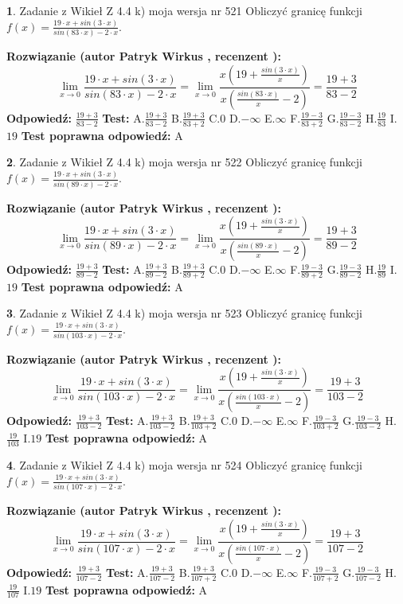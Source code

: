 \documentclass[12pt, a4paper]{article}
\theoremstyle{definition} %
\newtheorem{zad}{}
\newcommand{\zadStart}[1]{\begin{zad}#1\newline}
\newcommand{\zadStop}{\end{zad}}
\newcommand{\rozwStart}[2]{\noindent \textbf{Rozwiązanie (autor #1 , recenzent #2): }\newline}
\newcommand{\rozwStop}{\newline}
\newcommand{\odpStart}{\noindent \textbf{Odpowiedź:}\newline}
\newcommand{\odpStop}{\newline}
\newcommand{\testStart}{\noindent \textbf{Test:}\newline}
\newcommand{\testStop}{\newline}
\newcommand{\kluczStart}{\noindent \textbf{Test poprawna odpowiedź:}\newline}
\newcommand{\kluczStop}{\newline}
\begin{document}
\zadStart{Zadanie z Wikieł Z 4.4 k) moja wersja nr 521}
Obliczyć granicę funkcji $f(x)=\frac{19\cdot x +sin(3\cdot x)}{sin(83\cdot x) -2\cdot x}$.
\zadStop
\rozwStart{Patryk Wirkus}{}
$$\lim\limits_{x\to 0}\frac{19\cdot x +sin(3\cdot x)}{sin(83\cdot x) -2\cdot x}
=\lim\limits_{x\to 0}\frac{x(19+\frac{sin(3\cdot x)}{x})}{x(\frac{sin(83\cdot x)}{x}-2)}
=\frac{19+3}{83-2}$$
\rozwStop
\odpStart
$\frac{19+3}{83-2}$
\odpStop
\testStart
A.$\frac{19+3}{83-2}$
B.$\frac{19+3}{83+2}$
C.$0$
D.$-\infty$
E.$\infty$
F.$\frac{19-3}{83+2}$
G.$\frac{19-3}{83-2}$
H.$\frac{19}{83}$
I.$19$
\testStop
\kluczStart
A
\kluczStop



\zadStart{Zadanie z Wikieł Z 4.4 k) moja wersja nr 522}
Obliczyć granicę funkcji $f(x)=\frac{19\cdot x +sin(3\cdot x)}{sin(89\cdot x) -2\cdot x}$.
\zadStop
\rozwStart{Patryk Wirkus}{}
$$\lim\limits_{x\to 0}\frac{19\cdot x +sin(3\cdot x)}{sin(89\cdot x) -2\cdot x}
=\lim\limits_{x\to 0}\frac{x(19+\frac{sin(3\cdot x)}{x})}{x(\frac{sin(89\cdot x)}{x}-2)}
=\frac{19+3}{89-2}$$
\rozwStop
\odpStart
$\frac{19+3}{89-2}$
\odpStop
\testStart
A.$\frac{19+3}{89-2}$
B.$\frac{19+3}{89+2}$
C.$0$
D.$-\infty$
E.$\infty$
F.$\frac{19-3}{89+2}$
G.$\frac{19-3}{89-2}$
H.$\frac{19}{89}$
I.$19$
\testStop
\kluczStart
A
\kluczStop



\zadStart{Zadanie z Wikieł Z 4.4 k) moja wersja nr 523}
Obliczyć granicę funkcji $f(x)=\frac{19\cdot x +sin(3\cdot x)}{sin(103\cdot x) -2\cdot x}$.
\zadStop
\rozwStart{Patryk Wirkus}{}
$$\lim\limits_{x\to 0}\frac{19\cdot x +sin(3\cdot x)}{sin(103\cdot x) -2\cdot x}
=\lim\limits_{x\to 0}\frac{x(19+\frac{sin(3\cdot x)}{x})}{x(\frac{sin(103\cdot x)}{x}-2)}
=\frac{19+3}{103-2}$$
\rozwStop
\odpStart
$\frac{19+3}{103-2}$
\odpStop
\testStart
A.$\frac{19+3}{103-2}$
B.$\frac{19+3}{103+2}$
C.$0$
D.$-\infty$
E.$\infty$
F.$\frac{19-3}{103+2}$
G.$\frac{19-3}{103-2}$
H.$\frac{19}{103}$
I.$19$
\testStop
\kluczStart
A
\kluczStop



\zadStart{Zadanie z Wikieł Z 4.4 k) moja wersja nr 524}
Obliczyć granicę funkcji $f(x)=\frac{19\cdot x +sin(3\cdot x)}{sin(107\cdot x) -2\cdot x}$.
\zadStop
\rozwStart{Patryk Wirkus}{}
$$\lim\limits_{x\to 0}\frac{19\cdot x +sin(3\cdot x)}{sin(107\cdot x) -2\cdot x}
=\lim\limits_{x\to 0}\frac{x(19+\frac{sin(3\cdot x)}{x})}{x(\frac{sin(107\cdot x)}{x}-2)}
=\frac{19+3}{107-2}$$
\rozwStop
\odpStart
$\frac{19+3}{107-2}$
\odpStop
\testStart
A.$\frac{19+3}{107-2}$
B.$\frac{19+3}{107+2}$
C.$0$
D.$-\infty$
E.$\infty$
F.$\frac{19-3}{107+2}$
G.$\frac{19-3}{107-2}$
H.$\frac{19}{107}$
I.$19$
\testStop
\kluczStart
A
\kluczStop
\end{document}
